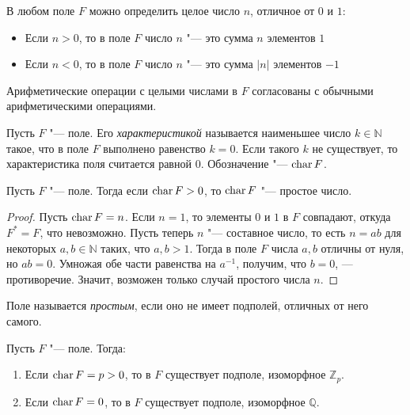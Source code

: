 \begin{note}
	В любом поле $F$ можно определить целое число $n$, отличное от $0$ и $1$:
	\begin{itemize}
		\item Если $n > 0$, то в поле $F$ число $n$ "--- это сумма $n$ элементов $1$
		\item Если $n < 0$, то в поле $F$ число $n$ "--- это сумма $|n|$ элементов $-1$
	\end{itemize}
	
	Арифметические операции с целыми числами в $F$ согласованы с обычными арифметическими операциями.
\end{note}

\begin{definition}
	Пусть $F$ "--- поле. Его \textit{характеристикой} называется наименьшее число $k \in \mathbb{N}$ такое, что в поле $F$ выполнено равенство $k = 0$. Если такого $k$ не существует, то характеристика поля считается равной $0$. Обозначение "--- $\operatorname{char}{F}$.
\end{definition}

\begin{proposition}
	Пусть $F$ "--- поле. Тогда если $\operatorname{char}{F} > 0$, то $\operatorname{char}{F}$ "--- простое число.
\end{proposition}

\begin{proof}
	Пусть $\operatorname{char}{F} = n$. Если $n = 1$, то элементы $0$ и $1$ в $F$ совпадают, откуда $F^* = F$, что невозможно. Пусть теперь $n$ "--- составное число, то есть $n = ab$ для некоторых $a, b \in \mathbb{N}$ таких, что $a, b > 1$. Тогда в поле $F$ числа $a, b$ отличны от нуля, но $ab = 0$. Умножая обе части равенства на $a^{-1}$, получим, что $b = 0$, --- противоречие. Значит, возможен только случай простого числа $n$.
\end{proof}

\begin{definition}
	Поле называется \textit{простым}, если оно не имеет подполей, отличных от него самого.
\end{definition}

\begin{theorem}
	Пусть $F$ "--- поле. Тогда:
	\begin{enumerate}
		\item Если $\operatorname{char}{F} = p > 0$, то в $F$ существует подполе, изоморфное $\mathbb{Z}_p$.
		\item Если $\operatorname{char}{F} = 0$, то в $F$ существует подполе, изоморфное $\mathbb{Q}$.
	\end{enumerate}
\end{theorem}


